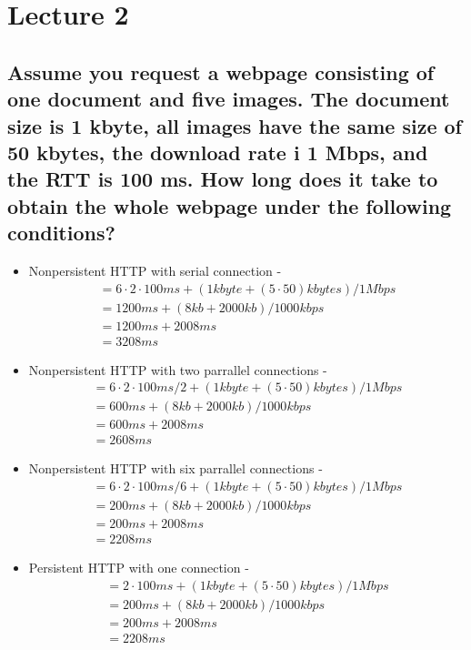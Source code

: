 \documentclass[12pt, a4paper]{article}
\begin{document}
	\section{Lecture 2}
		\subsection{Assume you request a webpage consisting of one document and five images. The document size is 1 kbyte, all images have the same size of 50 kbytes, the download rate i 1 Mbps, and the RTT is 100 ms. How long does it take to obtain the whole webpage under the following conditions? }
			\begin{itemize}
				\item Nonpersistent HTTP with serial connection - 
				\begin{align*}
					= 6 \cdot 2\cdot 100ms + (1kbyte + (5\cdot 50)kbytes)/1Mbps\\
					=1200ms + (8kb + 2000kb)/1000kbps\\
					=1200ms + 2008ms\\
					=3208ms
				\end{align*}
				\item Nonpersistent HTTP with two parrallel connections - 
				\begin{align*}
					= 6 \cdot 2\cdot 100ms / 2 + (1kbyte + (5\cdot 50)kbytes)/1Mbps\\
					=600ms + (8kb + 2000kb)/1000kbps\\
					=600ms + 2008ms\\
					=2608ms
				\end{align*}				
				\item Nonpersistent HTTP with six parrallel connections - 
				\begin{align*}
					= 6 \cdot 2\cdot 100ms / 6 + (1kbyte + (5\cdot 50)kbytes)/1Mbps\\
					=200ms + (8kb + 2000kb)/1000kbps\\
					=200ms + 2008ms\\
					=2208ms
				\end{align*}			
				\item Persistent HTTP with one connection -  
				\begin{align*}
					= 2\cdot 100ms + (1kbyte + (5\cdot 50)kbytes)/1Mbps\\
					=200ms + (8kb + 2000kb)/1000kbps\\
					=200ms + 2008ms\\
					=2208ms
				\end{align*}	
			\end{itemize}
\end{document}
